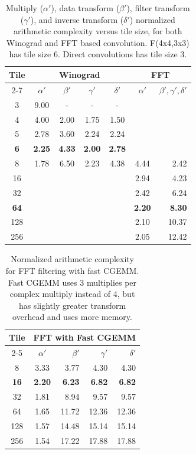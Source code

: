 \documentclass[10pt,twocolumn,letterpaper]{article}
\begin{document}
\begin{table}
\begin{center}
\begin{tabular}{|c|cccc|c r|}
\hline
\multirow{2}{*}{Tile} & \multicolumn{4}{c|}{Winograd} &  \multicolumn{2}{c|}{FFT} \\
\cline{2-7}
 & $\alpha'$ & $\beta'$ & $\gamma'$    & $\delta'$ & $\alpha'$ & $\beta',\gamma',\delta'$ \\
\hline
\hline
3 &  9.00 & \multicolumn{1}{c}{-} & \multicolumn{1}{c}{-} & \multicolumn{1}{c|}{-}  & & \\
4 & 4.00 & 2.00 & 1.75 & 1.50 & & \\
5 & 2.78 & 3.60 & 2.24 & 2.24 & &  \\ 
\textbf{6} &  \textbf{2.25} & \textbf{4.33} & \textbf{2.00} & \textbf{2.78}  & & \\ 
8 & 1.78 & 6.50 & 2.23 & 4.38 & 4.44 & 2.42 \\
16 &  &  &  &  & 2.94 & 4.23 \\
32 &  &  &  &   & 2.42 & 6.24 \\
\textbf{64} &  &  &  &   & \textbf{2.20} & \textbf{8.30} \\
128 &  &  &  &  & 2.10 & 10.37  \\
256 &  &  &  &   & 2.05 & 12.42 \\
\hline
\end{tabular}
\end{center}
\caption{Multiply ($\alpha'$), data transform ($\beta'$), filter transform ($\gamma'$), and inverse transform ($\delta'$) normalized arithmetic complexity versus tile size, for both Winograd and FFT based convolution. F(4x4,3x3) has tile size 6. Direct convolutions has tile size 3.}
\label{table:complexity-versus-tile-size}
\end{table}

\begin{table}
\begin{center}
\begin{tabular}{|c|c r r r|}
\hline
\multirow{2}{*}{Tile}& \multicolumn{4}{c|}{FFT with Fast CGEMM}\\
\cline{2-5}
 & $\alpha'$ & $\beta'$ & $\gamma'$ & $\delta'$ \\
\hline
\hline
8 & 3.33 & 3.77 & 4.30 & 4.30 \\
\textbf{16}  & \textbf{2.20} & \textbf{6.23} & \textbf{6.82} & \textbf{6.82} \\
32 & 1.81 & 8.94 & 9.57 & 9.57 \\
64 & 1.65 & 11.72 & 12.36 & 12.36 \\
128 & 1.57 & 14.48 & 15.14 & 15.14 \\
256 & 1.54 & 17.22 & 17.88 & 17.88 \\
\hline
\end{tabular}
\end{center}
\caption{Normalized arithmetic complexity for FFT filtering with fast CGEMM. Fast CGEMM uses 3 multiplies per complex multiply instead of 4, but has slightly greater transform overhead and uses more memory.}
\label{table:complexity-versus-tile-size-fast-cgemm}
\end{table}
\end{document}
